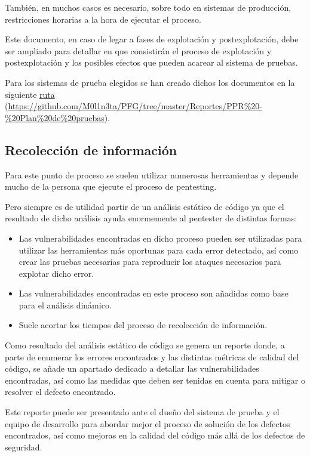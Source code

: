 También, en muchos casos es necesario, sobre todo en sistemas de producción, restricciones horarias a la hora de ejecutar el proceso.

Este documento, en caso de legar a fases de explotación y postexplotación, debe ser ampliado para detallar en que consistirán el 
proceso de explotación y postexplotación y los posibles efectos que pueden acarear al sistema de pruebas.

Para los sistemas de prueba elegidos se han creado dichos los documentos en la siguiente 
\href{https://github.com/M0l1n3ta/PFG/tree/master/Reportes/PPR%20-%20Plan%20de%20pruebas}{ruta}
(\url{https://github.com/M0l1n3ta/PFG/tree/master/Reportes/PPR%20-%20Plan%20de%20pruebas}).

\clearpage
\subsection{Recolección de información}

Para este punto de proceso se suelen utilizar numerosas herramientas y depende mucho de la persona que ejecute 
el proceso de pentesting. 

Pero siempre es de utilidad partir de un análisis estático de código ya que el resultado de dicho 
análisis ayuda enormemente al pentester de distintas formas:

\begin{itemize}
    \item Las vulnerabilidades encontradas en dicho proceso pueden ser utilizadas para utilizar las herramientas más 
    oportunas para cada error detectado, así como crear las pruebas necesarias para reproducir los ataques necesarios 
    para explotar dicho error.
    \item Las vulnerabilidades encontradas en este proceso son añadidas como base para el análisis dinámico.
    \item Suele acortar los tiempos del proceso de recolección de información.
\end{itemize}

Como resultado del análisis estático de código se genera un reporte donde, a parte de enumerar los errores
encontrados y las distintas métricas de calidad del código, se añade un apartado dedicado a detallar las 
vulnerabilidades encontradas, así como las medidas que deben ser tenidas en cuenta para mitigar o resolver el defecto encontrado.

Este reporte puede ser presentado ante el dueño del sistema de prueba y el equipo de desarrollo para abordar mejor 
el proceso de solución de los defectos encontrados, así como mejoras en la calidad del código más allá de los defectos de seguridad.

